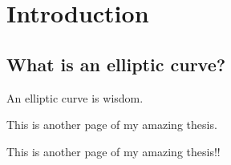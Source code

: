 \chapter{Introduction}%
\label{sec:introduction}

\section{What is an elliptic curve?}

An elliptic curve is wisdom. ~\cite{Example}

\pagebreak

This is another page of my amazing thesis.

\pagebreak

This is another page of my amazing thesis!!